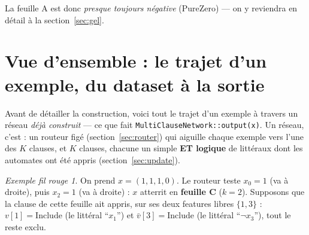 \documentclass[12pt,a4paper]{article}
\newcommand{\Inc}{\ensuremath{\mathrm{Include}}}
\newcommand{\vbar}{\bar{v}}
\newcommand{\code}[1]{\texttt{#1}}
\theoremstyle{remark}
\newtheorem{exemple}{Exemple fil rouge}[section]
\begin{document}
\noindent La feuille A est donc \emph{presque toujours négative} (PureZero) --- on
y reviendra en détail à la section~\ref{sec:gel}.

\section{Vue d'ensemble : le trajet d'un exemple, du dataset à la sortie}

Avant de détailler la construction, voici tout le trajet d'un exemple à travers
un réseau \emph{déjà construit} --- ce que fait \code{MultiClauseNetwork::output(x)}.
Un réseau, c'est : un routeur figé (section~\ref{sec:router}) qui aiguille chaque
exemple vers l'une des $K$ clauses, et $K$ clauses, chacune un simple \textbf{ET
logique} de littéraux dont les automates ont été appris (section~\ref{sec:update}).

\begin{exemple}
On prend $x=(1,1,1,0)$. Le routeur teste $x_0{=}1$ (va à droite), puis $x_2{=}1$
(va à droite) : $x$ atterrit en \textbf{feuille C} ($k{=}2$). Supposons que la
clause de cette feuille ait appris, sur ses deux features libres $\{1,3\}$ :
$v[1]=\Inc$ (le littéral ``$x_1$'') et $\vbar[3]=\Inc$ (le littéral ``$\neg x_3$''),
tout le reste exclu.
\end{exemple}
\end{document}
